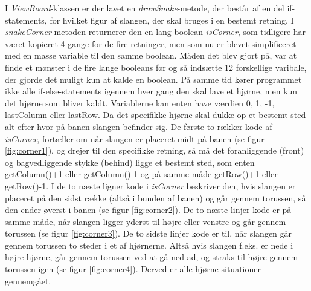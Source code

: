 \documentclass{report}
\begin{document}
I \textit{ViewBoard}-klassen er der lavet en \textit{drawSnake}-metode, der består af en del if-statements, for hvilket figur af slangen, der skal bruges i en bestemt retning. I \textit{snakeCorner}-metoden returnerer den en lang boolean \textit{isCorner}, som tidligere har været kopieret 4 gange for de fire retninger, men som nu er blevet simplificeret med en masse variable til den samme boolean. Måden det blev gjort på, var at finde et mønster i de fire lange booleans før og så indsætte 12 forskellige varibale, der gjorde det muligt kun at kalde en boolean. På samme tid kører programmet ikke alle if-else-statements igennem hver gang den skal lave et hjørne, men kun det hjørne som bliver kaldt. Variablerne kan enten have værdien 0, 1, -1, lastColumn eller lastRow. Da det specifikke hjørne skal dukke op et bestemt sted alt efter hvor på banen slangen befinder sig.
De første to rækker kode af \textit{isCorner}, fortæller om når slangen er placeret midt på banen (se figur \ref{fig:corner1}), og drejer til den specifikke retning, så må det foranliggende (front) og bagvedliggende stykke (behind) ligge et bestemt sted, som enten getColumn()+1 eller getColumn()-1 og på samme måde getRow()+1 eller getRow()-1. I de to næste ligner kode i \textit{isCorner} beskriver den, hvis slangen er placeret på den sidst række (altså i bunden af banen) og går gennem torussen, så den ender øverst i banen (se figur \ref{fig:corner2}).
De to næste linjer kode er på samme måde, når slangen ligger yderst til højre eller venstre og går gennem torussen (se figur \ref{fig:corner3}).
De to sidste linjer kode er til, når slangen går gennem torussen to steder i et af hjørnerne. Altså hvis slangen f.eks. er nede i højre hjørne, går gennem torussen ved at gå ned ad, og straks til højre gennem torussen igen (se figur \ref{fig:corner4}). 
Derved er alle hjørne-situationer gennemgået.
\end{document}
